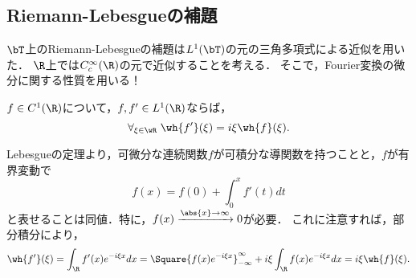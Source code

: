 \documentclass[uplatex,dvipdfmx]{jsreport}
\begin{document}
\subsection{Riemann-Lebesgueの補題}

\begin{tcolorbox}[colframe=ForestGreen, colback=ForestGreen!10!white,breakable,colbacktitle=ForestGreen!40!white,coltitle=black,fonttitle=\bfseries\sffamily,
title=]
    $\bT$上のRiemann-Lebesgueの補題は$L^1(\bT)$の元の三角多項式による近似を用いた．
    $\R$上では$C_c^\infty(\R)$の元で近似することを考える．
    そこで，Fourier変換の微分に関する性質を用いる！
\end{tcolorbox}

\begin{lemma}[微分とFourier変換]\label{lemma-differential-and-Fourier-transform}
    $f\in C^1(\R)$について，$f,f'\in L^1(\R)$ならば，
    \[\forall_{\xi\in\wR}\;\wh{f'}(\xi)=i\xi\wh{f}(\xi).\]
\end{lemma}
\begin{Proof}
    Lebesgueの定理より，可微分な連続関数$f$が可積分な導関数を持つことと，$f$が有界変動で
    \[f(x)=f(0)+\int_0^xf'(t)dt\]
    と表せることは同値．特に，$f(x)\xrightarrow{\abs{x}\to\infty}0$が必要．
    これに注意すれば，部分積分により，
    \[\wh{f'}(\xi)=\int_\R f'(x)e^{-i\xi x}dx=\Square{f(x)e^{-i\xi x}}^\infty_{-\infty}+i\xi\int_\R f(x)e^{-i\xi x}dx=i\xi\wh{f}(\xi).\]
\end{Proof}
\end{document}
